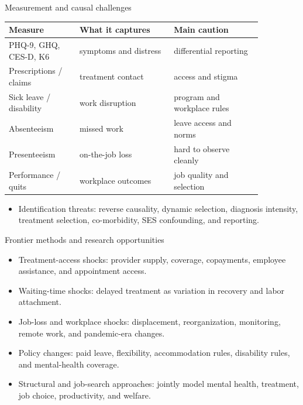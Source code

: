 \documentclass[aspectratio=169,11pt]{beamer}
\begin{document}
\begin{frame}{Measurement and causal challenges}
\small
\begin{tabular}{p{0.24\linewidth} p{0.32\linewidth} p{0.30\linewidth}}
\toprule
Measure & What it captures & Main caution \\
\midrule
PHQ-9, GHQ, CES-D, K6 & symptoms and distress & differential reporting \\
Prescriptions / claims & treatment contact & access and stigma \\
Sick leave / disability & work disruption & program and workplace rules \\
Absenteeism & missed work & leave access and norms \\
Presenteeism & on-the-job loss & hard to observe cleanly \\
Performance / quits & workplace outcomes & job quality and selection \\
\bottomrule
\end{tabular}
\vspace{0.25cm}
\begin{itemize}
    \item Identification threats: reverse causality, dynamic selection, diagnosis intensity, treatment selection, co-morbidity, SES confounding, and reporting.
\end{itemize}
\end{frame}

\begin{frame}{Frontier methods and research opportunities}
\begin{itemize}
    \item Treatment-access shocks: provider supply, coverage, copayments, employee assistance, and appointment access.
    \item Waiting-time shocks: delayed treatment as variation in recovery and labor attachment.
    \item Job-loss and workplace shocks: displacement, reorganization, monitoring, remote work, and pandemic-era changes.
    \item Policy changes: paid leave, flexibility, accommodation rules, disability rules, and mental-health coverage.
    \item Structural and job-search approaches: jointly model mental health, treatment, job choice, productivity, and welfare.
\end{itemize}
\end{frame}
\end{document}
